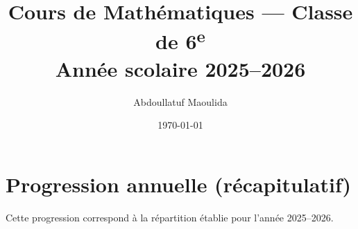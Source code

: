 \documentclass[12pt,a4paper]{book}
\title{Cours de Mathématiques — Classe de 6\textsuperscript{e}\\[0.4em]\large Année scolaire 2025–2026}
\author{Abdoullatuf Maoulida}
\date{\today}
\begin{document}
\maketitle
\tableofcontents
\cleardoublepage

%

\cleardoublepage
\appendix
\chapter{Progression annuelle (récapitulatif)}
Cette progression correspond à la répartition établie pour l'année 2025–2026.
\end{document}
